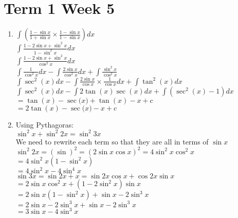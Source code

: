 \documentclass[../main.tex]{subfiles}
\begin{document}
\section*{Term 1 Week 5}
\begin{enumerate}
    \item 
    \(\int (\frac{1-\sin{x}}{1+\sin{x}} \times \frac{1-\sin{x}}{1-\sin{x}}) dx\)\\

    \(\int \frac{1-2\sin{x}+\sin^2{x}}{1-\sin^2{x}} dx\)\\

    \(\int \frac{1-2\sin{x}+\sin^2{x}}{\cos^2{x}} dx\)\\

    \(\int \frac{1}{\cos^2{x}} dx-\int \frac{2\sin{x}}{\cos^2{x}}dx + \int \frac{\sin^2{x}}{\cos^2{x}} \)\\

    \(\int \sec^2{(x)}dx - \int \frac{2\sin{x}}{\cos{x}}\times \frac{1}{\cos{x}} dx + \int \tan^2{(x)}dx\)\\

    \(\int \sec^2{(x)}dx - \int 2\tan{(x)}\sec{(x)} dx + \int (\sec^2{(x)}-1) dx\)\\

    \(=\tan{(x)}-\sec{(x})+\tan{(x)}-x+c\)\\

    \(=2\tan{(x)}-\sec{(x})-x+c\)\\
    
    \item 
    Using Pythagoras:\\
    \(\sin^2{x}+\sin^2{2x}=\sin^2{3x}\)\\

    We need to rewrite each term so that they are all in terms of \(\sin{x}\)\\
    \(\sin^2{2x}=(\sin{})^2=(2\sin{x}\cos{x})^2=4\sin^2{x}\cos^2{x}\)\\
    \(=4\sin^2{x}(1-\sin^2{x})\)\\
    \(=4\sin^2{x}-4\sin^4{x}\)\\

    \(\sin{3x}=\sin{2x+x}=\sin{2x}\cos{x}+\cos{2x}\sin{x}\)\\
    \(=2\sin{x}\cos^2{x}+(1-2\sin^2{x})\sin{x}\)\\
    \(=2\sin{x}(1-\sin^2{x})+\sin{x}-2\sin^3{x}\)\\
    \(=2\sin{x}-2\sin^3{x}+\sin{x}-2\sin^3{x}\)\\
    \(=3\sin{x}-4\sin^3{x}\)\\
    

\end{enumerate}
\end{document}
